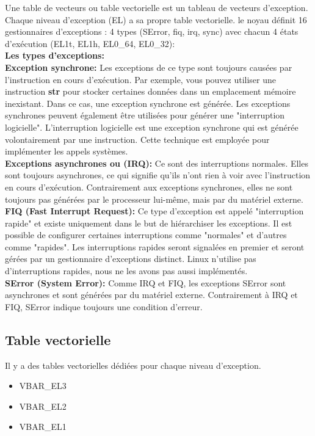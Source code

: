 \documentclass[12pt,a4paper,oneside]{book}
\begin{document}
	Une table de vecteurs ou table vectorielle est un tableau de vecteurs d'exception. Chaque niveau d'exception (EL) a sa propre table vectorielle. le noyau définit 16 gestionnaires d'exceptions : 4 types (SError, fiq, irq, sync) avec chacun 4 états d'exécution (EL1t, EL1h, EL0\_64, EL0\_32):\\

	\textbf{Les types d'exceptions:}\\
	
	\textbf{Exception synchrone:} Les exceptions de ce type sont toujours causées par l'instruction en cours d'exécution. Par exemple, vous pouvez utiliser une instruction \textbf{str} pour stocker certaines données dans un emplacement mémoire inexistant. Dans ce cas, une exception synchrone est générée. Les exceptions synchrones peuvent également être utilisées pour générer une "interruption logicielle". L'interruption logicielle est une exception synchrone qui est générée volontairement par une instruction. Cette technique est employée pour implémenter les appels systèmes.\\

	\textbf{Exceptions asynchrones ou (IRQ):} Ce sont des interruptions normales. Elles sont toujours asynchrones, ce qui signifie qu'ils n'ont rien à voir avec l'instruction en cours d'exécution. Contrairement aux exceptions synchrones, elles ne sont toujours pas générées par le processeur lui-même, mais par du matériel externe.\\

	\textbf{FIQ (Fast Interrupt Request):} Ce type d'exception est appelé "interruption rapide" et existe uniquement dans le but de hiérarchiser les exceptions. Il est possible de configurer certaines interruptions comme "normales" et d'autres comme "rapides". Les interruptions rapides seront signalées en premier et seront gérées par un gestionnaire d'exceptions distinct. Linux n'utilise pas d'interruptions rapides, nous ne les avons pas aussi implémentés.\\

	\textbf{SError (System Error):}  Comme IRQ et FIQ, les exceptions SError sont asynchrones et sont générées par du matériel externe. Contrairement à IRQ et FIQ, SError indique toujours une condition d'erreur.

	\subsection{Table vectorielle}
	
	Il y a des tables vectorielles dédiées pour chaque niveau d'exception.
	\begin{itemize}
		\item VBAR\_EL3
		\item VBAR\_EL2
		\item  VBAR\_EL1
	\end{itemize}
	
\end{document}
